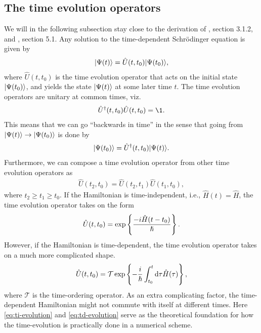     \subsection{The time evolution operators}
        We will in the following subsection stay close to the derivation of
        \citeauthor{ullrich2011time}, section 3.1.2, and
        \citeauthor{joachain2012atoms}, section 5.1.  Any solution to the
        time-dependent Schrödinger equation is given by
        \begin{align}
            | \Psi(t) \rangle = \hat{U}(t, t_0)| \Psi(t_0) \rangle,
        \end{align}
        where $\hat{U}(t, t_0)$ is the time evolution operator that acts on the
        initial state $| \Psi(t_0) \rangle$, and yields the state $| \Psi(t) \rangle$ at
        some later time $t$. The time evolution operators are unitary at common
        times, viz.
        \begin{align}
            \hat{U}^{\dagger}(t, t_0)\hat{U}(t, t_0) = \1.
        \end{align}
        This means that we can go ``backwards in time'' in the sense that going
        from $| \Psi(t) \rangle \to | \Psi(t_0) \rangle$ is done by
        \begin{align}
            | \Psi(t_0) \rangle = \hat{U}^{\dagger}(t, t_0)| \Psi(t) \rangle.
        \end{align}
        Furthermore, we can compose a time evolution operator from other time
        evolution operators as
        \begin{align}
            \hat{U}(t_2, t_0) = \hat{U}(t_2, t_1)\hat{U}(t_1, t_0),
        \end{align}
        where $t_2 \geq t_1 \geq t_0$. If the Hamiltonian is time-independent,
        i.e., $\hat{H}(t) = \hat{H}$, the time evolution operator takes on the
        form
        \begin{align}
            \hat{U}(t, t_0) = \exp\left\{ 
                \frac{-i \hat{H} (t - t_0)}{\hslash}
             \right\}.
            \label{eq:ti-evolution}
        \end{align}
        However, if the Hamiltonian is time-dependent, the time evolution
        operator takes on a much more complicated shape.
        \begin{align}
            \hat{U}(t, t_0) =
            \mathcal{T}\exp\left\{ 
                -\frac{i}{\hslash} \int_{t_0}^{t} \mathrm{d}\tau
                \hat{H}(\tau)
             \right\},
            \label{eq:td-evolution}
        \end{align}
        where $\mathcal{T}$ is the time-ordering operator. As an extra
        complicating factor, the time-dependent Hamiltonian might not commute
        with itself at different times. Here \autoref{eq:ti-evolution} and
        \autoref{eq:td-evolution} serve as the theoretical foundation for how
        the time-evolution is practically done in a numerical scheme.

